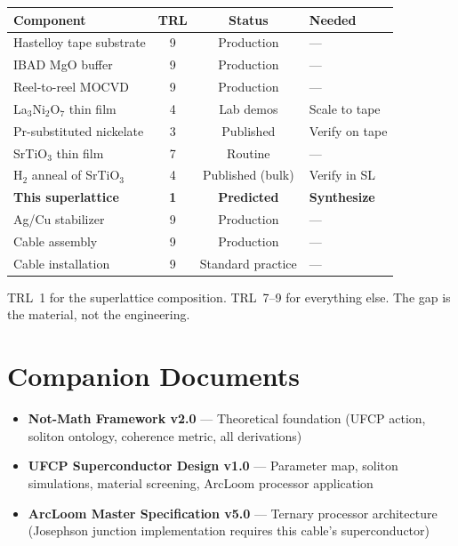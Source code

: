 \documentclass[11pt, a4paper]{article}
\begin{document}
\begin{center}
\begin{tabular}{@{}p{5cm}ccl@{}}
\toprule
\textbf{Component} & \textbf{TRL} & \textbf{Status} &
  \textbf{Needed} \\
\midrule
Hastelloy tape substrate & 9 & Production & --- \\
IBAD MgO buffer & 9 & Production & --- \\
Reel-to-reel MOCVD & 9 & Production & --- \\
La$_3$Ni$_2$O$_7$ thin film & 4 & Lab demos & Scale to tape \\
Pr-substituted nickelate & 3 & Published & Verify on tape \\
SrTiO$_3$ thin film & 7 & Routine & --- \\
H$_2$ anneal of SrTiO$_3$ & 4 & Published (bulk) & Verify in SL \\
\textbf{This superlattice} & \textbf{1} & \textbf{Predicted} &
  \textbf{Synthesize} \\
Ag/Cu stabilizer & 9 & Production & --- \\
Cable assembly & 9 & Production & --- \\
Cable installation & 9 & Standard practice & --- \\
\bottomrule
\end{tabular}
\end{center}

TRL~1 for the superlattice composition. TRL~7--9 for everything
else. The gap is the material, not the engineering.

\section{Companion Documents}

\begin{itemize}[nosep]
  \item \textbf{Not-Math Framework v2.0} --- Theoretical foundation
        (UFCP action, soliton ontology, coherence metric, all
        derivations)
  \item \textbf{UFCP Superconductor Design v1.0} --- Parameter map,
        soliton simulations, material screening, ArcLoom processor
        application
  \item \textbf{ArcLoom Master Specification v5.0} --- Ternary
        processor architecture (Josephson junction implementation
        requires this cable's superconductor)
\end{itemize}
\end{document}
